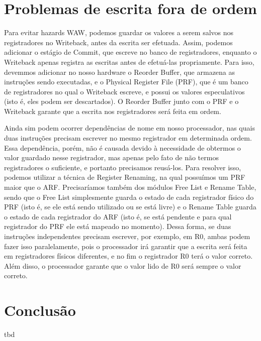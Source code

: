 \documentclass[12pt,a4paper]{article}
\numberwithin{equation}{section}
\begin{document}
\section{Problemas de escrita fora de ordem}

Para evitar hazards WAW, podemos guardar os valores a serem salvos nos registradores no Writeback, antes da escrita ser efetuada. Assim, podemos adicionar o estágio de Commit, que escreve no banco de registradores, enquanto o Writeback apenas registra as escritas antes de efetuá-las propriamente. Para isso, devemmos adicionar no nosso hardware o Reorder Buffer, que armazena as instruções sendo executadas, e o Physical Register File (PRF), que é um banco de registradores no qual o Writeback escreve, e possui os valores especulativos (isto é, eles podem ser descartados). O Reorder Buffer junto com o PRF e o Writeback garante que a escrita nos registradores será feita em ordem.

Ainda sim podem ocorrer dependências de nome em nosso processador, nas quais duas instruções precisam escrever no mesmo registrador em determinada ordem. Essa dependência, porém, não é causada devido à necessidade de obtermos o valor guardado nesse registrador, mas apenas pelo fato de não termos registradores o suficiente, e portanto precisamos reusá-los. Para resolver isso, podemos utilizar a técnica de Register Renaming, na qual possuímos um PRF maior que o ARF. Precisaríamos também dos módulos Free List e Rename Table, sendo que o Free List simplesmente guarda o estado de cada registrador físico do PRF (isto é, se ele está sendo utilizado ou se está livre) e o Rename Table guarda o estado de cada registrador do ARF (isto é, se está pendente e para qual registrador do PRF ele está mapeado no momento). Dessa forma, se duas instruções independentes precisam escrever, por exemplo, em R0, ambas podem fazer isso paralelamente, pois o processador irá garantir que a escrita será feita em registradores físicos diferentes, e no fim o registrador R0 terá o valor correto. Além disso, o processador garante que o valor lido de R0 será sempre o valor correto.

\section{Conclusão}

tbd
\end{document}
